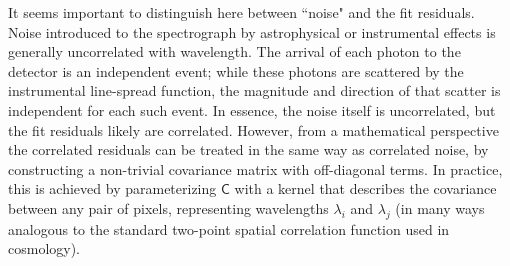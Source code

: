 \documentclass[iop,floatfix]{emulateapj}
\newcommand{\vC}{\mathsf{C}}
\begin{document}
It seems important to distinguish here between ``noise" and the fit residuals.  Noise introduced to 
the spectrograph by astrophysical or instrumental effects is generally uncorrelated with 
wavelength.  The arrival of each photon to the detector is an independent event; while these 
photons are scattered by the instrumental line-spread function, the magnitude and direction of that 
scatter is independent for each such event.  In essence, the noise itself is uncorrelated, but the 
fit residuals likely are correlated.  However, from a mathematical perspective the correlated 
residuals can be treated in the same way as correlated noise, by constructing a non-trivial 
covariance matrix with off-diagonal terms.  In practice, this is achieved by parameterizing $\vC$ 
with a kernel that describes the covariance between any pair of pixels, representing wavelengths 
$\lambda_i$ and $\lambda_j$ (in many ways analogous to the standard two-point spatial correlation 
function used in cosmology).
\end{document}
